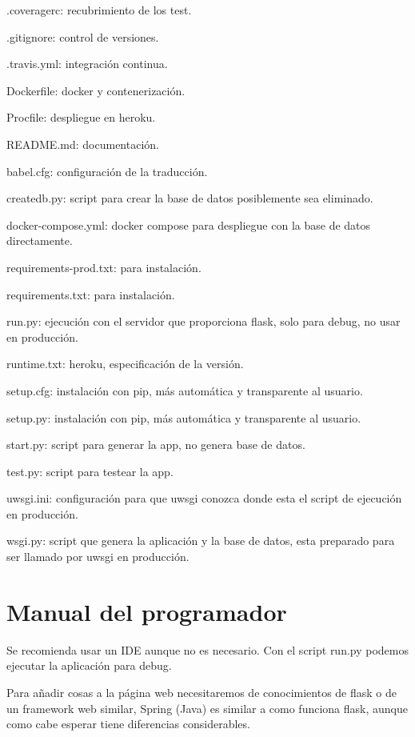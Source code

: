 \begin{list}{*}{}
\item .coveragerc: recubrimiento de los test.
\item .gitignore: control de versiones.
\item .travis.yml: integración continua.
\item Dockerfile: docker y contenerización.
\item Procfile: despliegue en heroku.
\item README.md: documentación.
\item babel.cfg: configuración de la traducción.
\item create\textunderscore db.py: script para crear la base de datos posiblemente sea eliminado.
\item docker-compose.yml: docker compose para despliegue con la base de datos directamente.
\item requirements-prod.txt: para instalación.
\item requirements.txt: para instalación.
\item run.py: ejecución con el servidor que proporciona flask, solo para debug, no usar en producción.
\item runtime.txt: heroku, especificación de la versión.
\item setup.cfg: instalación con pip, más automática y transparente al usuario. 
\item setup.py: instalación con pip, más automática y transparente al usuario. 
\item start.py: script para generar la app, no genera base de datos.
\item test.py: script para testear la app. 
\item uwsgi.ini: configuración para que uwsgi conozca donde esta el script de ejecución en producción.
\item wsgi.py: script que genera la aplicación y la base de datos, esta preparado para ser llamado por uwsgi en producción.
\end{list} 

\section{Manual del programador}

Se recomienda usar un IDE aunque no es necesario. Con el script run.py podemos ejecutar la aplicación para debug. 

Para añadir cosas a la página web necesitaremos de conocimientos de flask o de un framework web similar, Spring (Java) es similar a como funciona flask, aunque como cabe esperar tiene diferencias considerables.

